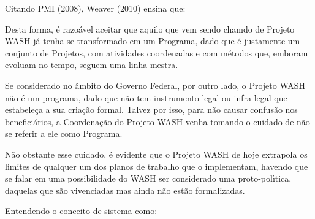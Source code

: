 \documentclass[
12pt,		%
openright,	%
twoside,  %
a4paper,			%
chapter=TITLE,		%
english,			%
french,				%
spanish,			%
brazil				%
]{USPSC-classe/USPSC_RedarTex}
\begin{document}
Citando  PMI (2008), Weaver (2010) ensina que:











\noindent\begin{center}\mbox{\centering{}}\end{center}


Desta forma, \'e razo\'avel aceitar que aquilo que vem sendo chamdo de Projeto WASH j\'a tenha se transformado em um Programa, dado que \'e justamente um conjunto de Projetos, com atividades coordenadas e com m\'etodos que, emboram evoluam no tempo, seguem uma linha mestra.










Se considerado no \^ambito do Governo Federal, por outro lado, o Projeto WASH n\~ao \'e um programa, dado que n\~ao tem instrumento legal ou infra-legal que estabele\c{c}a a sua cria\c{c}\~ao formal. Talvez por isso, para n\~ao causar confus\~ao nos benefici\'arios, a Coordena\c{c}\~ao do Projeto WASH venha tomando o cuidado de n\~ao se referir a ele como Programa.










N\~ao obstante esse cuidado, \'e evidente que o Projeto WASH de hoje extrapola os limites de qualquer um dos planos de trabalho que o implementam, havendo que se falar em uma possibilidade do WASH ser considerado uma proto-pol\'{\i}tica, daquelas que s\~ao vivenciadas mas ainda n\~ao est\~ao formalizadas.










Entendendo o conceito de sistema como:
\end{document}
